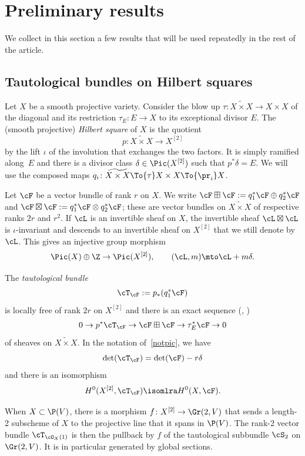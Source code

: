 \section{Preliminary results}
We collect in this section a few results that will be used repeatedly in the rest of the article.

\subsection{Tautological bundles on Hilbert squares}\label{sectaut}

Let $X$ be a smooth projective variety. Consider the blow up $\tau\colon \widetilde{X\times X}\to {X\times X}$ of the diagonal and its restriction $\tau_E\colon E\to X$ to its exceptional divisor $E$.
The (smooth projective) \emph{Hilbert square} of $X$ is the quotient
\[
p\colon \widetilde{X\times X} \to X^{[2]} 
\]
by the lift $\iota$ of the involution that exchanges the two factors. It is simply ramified along~$E$ and there is a divisor class $\delta\in \Pic( X^{[2]} )$ such that $p^*\delta =E$.
We will use the composed maps $q_i\colon\widetilde{X\times X}\To{\tau} X\times X\To{\pr_i} X$.

Let $\cF$ be a vector bundle of rank $r$ on $X$. We write $\cF\boxplus\cF:=q_1^*\cF\oplus q_2^*\cF$ and $\cF\boxtimes\cF:=q_1^*\cF\otimes q_2^*\cF$; these are vector bundles on $\widetilde{X\times X} $ of respective ranks $2r$ and $r^2$.
If $\cL$ is an invertible sheaf on $X$, the invertible sheaf $\cL\boxtimes\cL$ is $\iota$-invariant and descends to an invertible sheaf on $X^{[2]} $ that we still denote by $\cL$. This gives an injective group morphism
\begin{equation}\label{notpic}
\Pic(X)\oplus \Z \to \Pic(X^{[2]}),\qquad (\cL,m)\mto \cL+m\delta.
\end{equation}

The \emph{tautological bundle}
\[
\cT_\cF:=p_*(q_1^*\cF)
\]
is locally free of rank $2r$ on $X^{[2]}$ and there is an exact sequence (\cite[Prop.\,2.3]{dan}, \cite[(3)]{wan})
\[\label{deftaut}
0\to p^*\cT_\cF \to \cF\boxplus\cF \to \tau_E^*\cF\to 0
\]
of sheaves on $\widetilde{X\times X} $. In the notation of~\eqref{notpic}, we have
\begin{equation}\label{dete}
\det(\cT_\cF)= \det(\cF)-r {\delta}
\end{equation}
and there is an isomorphism
\[
H^0(X^{[2]}, \cT_\cF) \isomlra H^0(X,\cF).
\]

\begin{rema}\label{rem41}
When $X\subset \P(V)$, there is a morphism $f\colon X^{[2]}\to \Gr(2,V)$ that sends a length-2 subscheme of $X$ to the projective line that it spans in $\P(V) $. The rank-2 vector bundle $ \cT_{\cO_X(1)}$ is then the pullback by $f$ of the tautological subbundle $\cS_2$ on $\Gr(2,V) $. It is in particular generated by global sections.
\end{rema}

